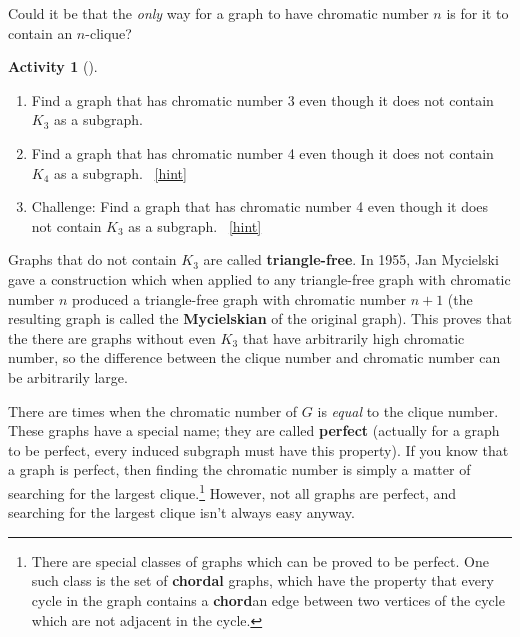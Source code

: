 \documentclass[10pt,]{book}
\newcommand{\terminology}[1]{\textbf{#1}}
\theoremstyle{plain}
\theoremstyle{definition}
\theoremstyle{definition}
\theoremstyle{definition}
\newtheorem{activity}[project]{Activity}
\numberwithin{equation}{chapter}
\begin{document}
\hypertarget{p-1634}{}%
Could it be that the \emph{only} way for a graph to have chromatic number \(n\) is for it to contain an \(n\)-clique?%
\begin{activity}[]\label{activity-301}
\leavevmode%
\begin{enumerate}[font=\bfseries,label=(\alph*),ref=\alph*]
\item\label{task-278} \hypertarget{p-1635}{}%
Find a graph that has chromatic number 3 even though it does not contain \(K_3\) as a subgraph.%
\item\label{task-279} \hypertarget{p-1637}{}%
Find a graph that has chromatic number 4 even though it does not contain \(K_4\) as a subgraph.%
~\hfill{\tiny\hyperlink{a-308.b}{[hint]}\hypertarget{q-308.b}{}}\item\label{task-280} \hypertarget{p-1640}{}%
Challenge: Find a graph that has chromatic number 4 even though it does not contain \(K_3\) as a subgraph.%
~\hfill{\tiny\hyperlink{a-308.c}{[hint]}\hypertarget{q-308.c}{}}\end{enumerate}
\end{activity}
\hypertarget{p-1643}{}%
Graphs that do not contain \(K_3\) are called \terminology{triangle-free}.  In 1955, Jan Mycielski gave a construction which when applied to any triangle-free graph with chromatic number \(n\) produced a triangle-free graph with chromatic number \(n+1\) (the resulting graph is called the \terminology{Mycielskian} of the original graph).  This proves that the there are graphs without even \(K_3\) that have arbitrarily high chromatic number, so the difference between the clique number and chromatic number can be arbitrarily large.%
\par
\hypertarget{p-1644}{}%
There are times when the chromatic number of \(G\) is \emph{equal} to the clique number. These graphs have a special name; they are called \terminology{perfect} (actually for a graph to be perfect, every induced subgraph must have this property). If you know that a graph is perfect, then finding the chromatic number is simply a matter of searching for the largest clique.\footnote{There are special classes of graphs which can be proved to be perfect.  One such class is the set of \terminology{chordal} graphs, which have the property that every cycle in the graph contains a \terminology{chord}\textemdash{}an edge between two vertices of the cycle which are not adjacent in the cycle.\label{fn-17}} However, not all graphs are perfect, and searching for the largest clique isn't always easy anyway.%
\par
\end{document}
